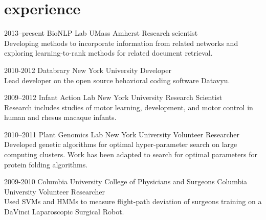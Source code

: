 \documentclass[]{friggeri-cv} %
\begin{document}

\section{experience}

\begin{entrylist}


\entry
{2013--present}
{BioNLP Lab}
{UMass Amherst}
{Research scientist \\
Developing methods to incorporate information from related networks and exploring learning-to-rank methods for related document retrieval.}

\entry
{2010-2012}
{Databrary}
{New York University}
{Developer \\
Lead developer on the open source behavioral coding software Datavyu.}

\entry
{2009--2012}
{Infant Action Lab}
{New York University}
{Research Scientist \\
Research includes studies of motor learning, development, and motor control in human and rhesus macaque infants.}

\entry
{2010--2011}
{Plant Genomics Lab}
{New York University}
{Volunteer Researcher \\
Developed genetic algorithms for optimal hyper-parameter search on large computing clusters.
Work has been adapted to search for optimal parameters for protein folding algorithms.}

\entry
{2009-2010}
{Columbia University College of Physicians and Surgeons}
{Columbia University}
{Volunteer Researcher \\
Used SVMs and HMMs to measure flight-path deviation of surgeons training on a DaVinci Laparoscopic Surgical Robot.}
\end{entrylist}


\end{document}
